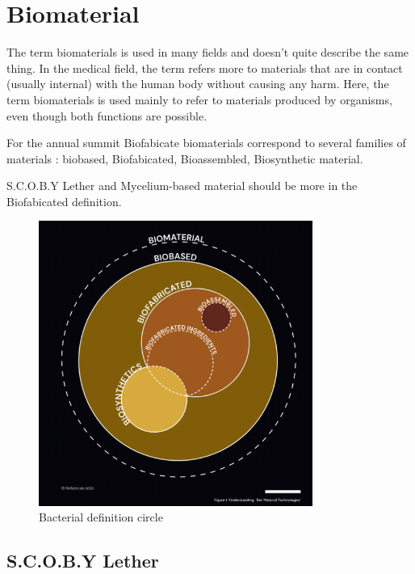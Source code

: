 \section{Biomaterial}

The term biomaterials is used in many fields and doesn't quite describe the same thing. In the medical field, the term refers more to materials that are in contact (usually internal) with the human body without causing any harm. Here, the term biomaterials is used mainly to refer to materials produced by organisms, even though both functions are possible.

For the annual summit Biofabicate biomaterials correspond to several families of materials : 
biobased, Biofabicated, Bioassembled, Biosynthetic material. 

S.C.O.B.Y Lether and Mycelium-based material should be more in the Biofabicated definition. 

\begin{figure}[h] 
    \centering
    \includegraphics[width=0.8\textwidth]{images/defcircle.png}
    \caption{Bacterial definition circle}
    \label{fig:defcircle}
\end{figure}




\subsection{S.C.O.B.Y Lether} 

